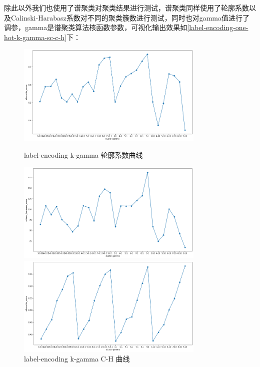 除此以外我们也使用了谱聚类对聚类结果进行测试，谱聚类同样使用了轮廓系数以及Calinski-Harabasz系数对不同的聚类簇数进行测试，同时也对gamma值进行了调参，gamma是谱聚类算法核函数参数，可视化输出效果如\ref{label-encoding-one-hot-k-gamma-sc-c-h}下：
\begin{figure}[htb]
    \vspace{13pt} %
    \centering
    \begin{minipage}[htb]{0.4\linewidth}
        \includegraphics[width=0.8\textwidth]{images/Spectral-clustering-sc-label-encoding.png}
        \caption{label-encoding k-gamma 轮廓系数曲线}
    \end{minipage}
    \begin{minipage}[htb]{0.4\linewidth}
        \includegraphics[width=0.8\textwidth]{images/Spectral-clustering-c-h-label-encoding.png}
        \caption{label-encoding k-gamma C-H 曲线}
    \end{minipage}
    \begin{minipage}[htb]{0.4\linewidth}
        \includegraphics[width=0.8\textwidth]{images/Spectral-clustering-sc-one-hot.png}

\end{minipage}
\end{figure}
